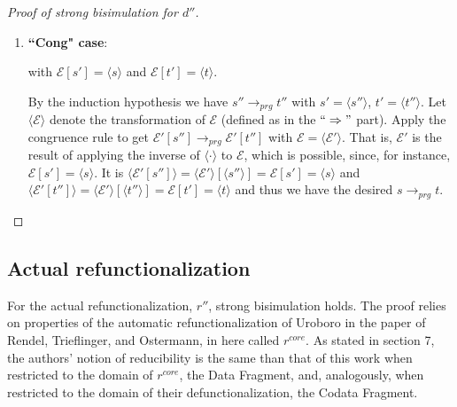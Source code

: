 \documentclass[11pt]{article} %
\begin{document}
\begin{proof}[Proof of strong bisimulation for $d''$]
\begin{enumerate}
were $prg'$ a well-typed program with copattern coverage for all subterms of $s$. Both of those properties can be shown or simulated similarly to the way they are in the $`` \Rightarrow "$ part.

But it is $prg' \subseteq prg$, as can be seen in the definition of $d''$. This implies the desired $s \longrightarrow_{prg} t$.

\item \textbf{``Cong" case}:

\begin{prooftree}
\end{prooftree}

with $\mathcal{E}[s'] = \langle s \rangle$ and $\mathcal{E}[t'] = \langle t \rangle$.

By the induction hypothesis we have $s'' \longrightarrow_{prg} t''$ with $s' = \langle s'' \rangle$, $t' = \langle t'' \rangle$. Let $\langle \mathcal{E} \rangle$ denote the transformation of $\mathcal{E}$ (defined as in the $`` \Rightarrow "$ part). Apply the congruence rule to get $\mathcal{E}'[s''] \longrightarrow_{prg} \mathcal{E}'[t'']$ with $\mathcal{E} = \langle \mathcal{E}' \rangle$. That is, $\mathcal{E}'$ is the result of applying the inverse of $\langle \cdot \rangle$ to $\mathcal{E}$, which is possible, since, for instance, $\mathcal{E}[s'] = \langle s \rangle$. It is $\langle \mathcal{E}'[s''] \rangle = \langle \mathcal{E}' \rangle[\langle s'' \rangle] = \mathcal{E}[s'] = \langle s \rangle$ and $\langle \mathcal{E}'[t''] \rangle = \langle \mathcal{E}' \rangle[\langle t'' \rangle] = \mathcal{E}[t'] = \langle t \rangle$ and thus we have the desired $s \longrightarrow_{prg} t$.
\end{enumerate}

\end{proof}

\subsection{Actual refunctionalization}

For the actual refunctionalization, $r''$, strong bisimulation holds. The proof relies on properties of the automatic refunctionalization of Uroboro in the paper of Rendel, Trieflinger, and Ostermann, in here called $r^{core}$. As stated in section 7, the authors' notion of reducibility is the same than that of this work when restricted to the domain of $r^{core}$, the Data Fragment, and, analogously, when restricted to the domain of their defunctionalization, the Codata Fragment.
\end{document}
